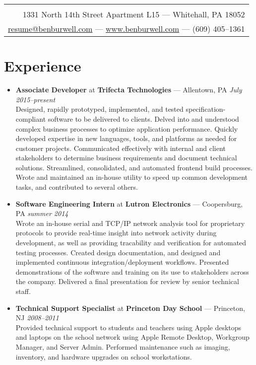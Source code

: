 \documentclass[11pt]{article}
\begin{document}
\thispagestyle{empty}

\noindent\begin{tabularx}{\textwidth}{|N|}
   \\
  1331 North 14th Street Apartment L15 --- Whitehall, PA 18052 \\
  \href{mailto:resume@benburwell.com}{resume@benburwell.com} --- \href{https://www.benburwell.com/}{www.benburwell.com} --- (609) 405--1361 \\
  \hline
\end{tabularx}



\section*{Experience}
\begin{itemize}
  \item \textbf{Associate Developer} at \textbf{Trifecta Technologies} --- Allentown, PA \hfill {\em July 2015--present} \\
    Designed, rapidly prototyped, implemented, and tested specification-compliant software to be delivered to clients.
    Delved into and understood complex business processes to optimize application performance.
    Quickly developed expertise in new languages, tools, and platforms as needed for customer projects.
    Communicated effectively with internal and client stakeholders to determine business requirements and document technical solutions.
    Streamlined, consolidated, and automated frontend build processes.
    Wrote and maintained an in-house utility to speed up common development tasks, and contributed to several others.

  \item \textbf{Software Engineering Intern} at \textbf{Lutron Electronics} --- Coopersburg, PA \hfill {\em summer 2014} \\
    Wrote an in-house serial and TCP/IP network analysis tool for proprietary protocols to provide real-time insight into network activity during development,
    as well as providing tracability and verification for automated testing processes.
    Created design documentation, and designed and implemented continuous integration/deployment workflows.
    Presented demonstrations of the software and training on its use to stakeholders across the company.
    Delivered a final presentation for review by senior technical staff.

  \item \textbf{Technical Support Specialist} at \textbf{Princeton Day School} --- Princeton, NJ \hfill {\em 2008--2011} \\
    Provided technical support to students and teachers using Apple desktops and laptops on the school network using Apple Remote Desktop, Workgroup Manager, and Server Admin.
    Performed maintenance such as imaging, inventory, and hardware upgrades on school workstations.
\end{itemize}
\end{document}
